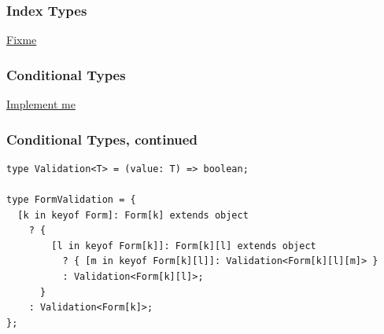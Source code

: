 \documentclass[aspectratio=169]{beamer}
\begin{document}
\begin{frame}
  \frametitle{Index Types}

  \href{https://bit.ly/3dVMzgx}{Fixme}
\end{frame}

\begin{frame}[fragile]
  \frametitle{Conditional Types}

  \href{https://bit.ly/3dXnfGX}{Implement me}
\end{frame}

\begin{frame}[fragile]
  \frametitle{Conditional Types, continued}

  \begin{verbatim}
type Validation<T> = (value: T) => boolean;

type FormValidation = {
  [k in keyof Form]: Form[k] extends object
    ? {
        [l in keyof Form[k]]: Form[k][l] extends object
          ? { [m in keyof Form[k][l]]: Validation<Form[k][l][m]> }
          : Validation<Form[k][l]>;
      }
    : Validation<Form[k]>;
};
\end{verbatim}
\end{frame}
\end{document}
